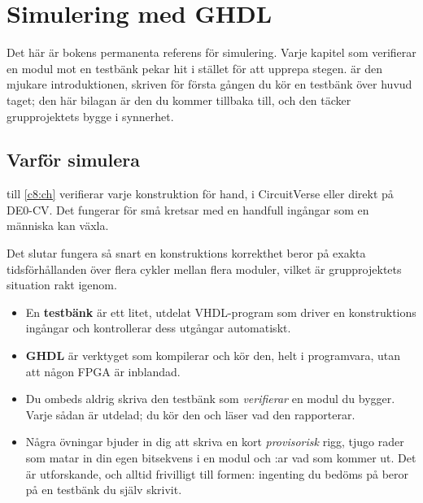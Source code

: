 
\chapter{Simulering med GHDL}
\label{app:sim}

Det här är bokens permanenta referens för simulering. Varje kapitel som verifierar en modul mot en
testbänk pekar hit i stället för att upprepa stegen.  är den mjukare
introduktionen, skriven för första gången du kör en testbänk över huvud taget; den här bilagan är den
du kommer tillbaka till, och den täcker grupprojektets bygge i synnerhet.

\section{Varför simulera}
\label{app:sim:why}

 till \ref{c8:ch} verifierar varje konstruktion för hand, i CircuitVerse eller direkt
på DE0-CV. Det fungerar för små kretsar med en handfull ingångar som en människa kan växla.

Det slutar fungera så snart en konstruktions korrekthet beror på exakta tidsförhållanden över flera
cykler mellan flera moduler, vilket är grupprojektets situation rakt igenom.

\begin{itemize}
  \item En \textbf{testbänk} är ett litet, utdelat VHDL-program som driver en konstruktions ingångar
    och kontrollerar dess utgångar automatiskt.
  \item \textbf{GHDL} är verktyget som kompilerar och kör den, helt i programvara, utan att någon
    FPGA är inblandad.
  \item Du ombeds aldrig skriva den testbänk som \emph{verifierar} en modul du bygger. Varje sådan
    är utdelad; du kör den och läser vad den rapporterar.
  \item Några övningar bjuder in dig att skriva en kort \emph{provisorisk} rigg, tjugo rader som
    matar in din egen bitsekvens i en modul och :ar vad som kommer ut. Det är
    utforskande, och alltid frivilligt till formen: ingenting du bedöms på beror på en testbänk du
    själv skrivit.
\end{itemize}

